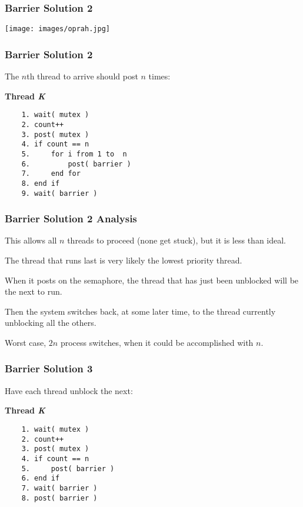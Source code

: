 \begin{frame}
	\frametitle{Barrier Solution 2}

	\begin{center}
		\texttt{[image: images/oprah.jpg]}
	\end{center}


\end{frame}


\begin{frame}[fragile]
	\frametitle{Barrier Solution 2}

	The $n$th thread to arrive should post $n$ times:

	\textbf{Thread \textit{K}}\vspace{-6em}
	\begin{verbatim}
	1. wait( mutex )
	2. count++
	3. post( mutex )
	4. if count == n
	5.     for i from 1 to  n
	6.         post( barrier )
	7.     end for
	8. end if
	9. wait( barrier )
  	\end{verbatim}
	\vspace{-2em}




\end{frame}

\begin{frame}
	\frametitle{Barrier Solution 2 Analysis}

	This allows all $n$ threads to proceed (none get stuck), but it is less than ideal.

	The thread that runs last is very likely the lowest priority thread.

	When it posts on the semaphore, the thread that has just been unblocked will be the next to run.

	Then the system switches back, at some later time, to the thread currently unblocking all the others.

	Worst case, $2n$ process switches, when it could be accomplished with $n$.


\end{frame}

\begin{frame}[fragile]
	\frametitle{Barrier Solution 3}

	Have each thread unblock the next:

	\textbf{Thread \textit{K}}\vspace{-6em}
	\begin{verbatim}
	1. wait( mutex )
	2. count++
	3. post( mutex )
	4. if count == n
	5.     post( barrier )
	6. end if
	7. wait( barrier )
	8. post( barrier )
  	\end{verbatim}
	\vspace{-2em}


\end{frame}


